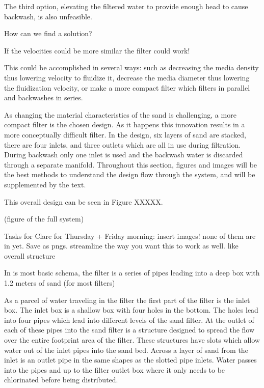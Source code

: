 \documentclass[letterpaper,10pt,english]{sphinxmanual}
\begin{document}
The third option, elevating the filtered water to provide enough head to cause backwash, is also unfeasible.


How can we find a solution?

If the velocities could be more similar the filter could work!

This could be accomplished in several ways: such as decreasing the media density thus lowering velocity to fluidize it, decrease the media diameter thus lowering the fluidization velocity, or make a more compact filter which filters in parallel and backwashes in series.

As changing the material characteristics of the sand is challenging, a more compact filter is the chosen design. As it happens this innovation results in a more conceptually difficult filter. In the design, six layers of sand are stacked, there are four inlets, and three outlets which are all in use during filtration. During backwash only one inlet is used and the backwash water is discarded through a separate manifold. Throughout this section, figures and images will be the best methods to understand the design flow through the system, and will be supplemented by the text.

This overall design can be seen in Figure XXXXX.

(figure of the full system)

Tasks for Clare for Thursday + Friday morning: insert images! none of them are in yet. Save as pngs. streamline the way you want this to work as well. like overall structure

In is most basic schema, the filter is a series of pipes leading into a deep box with 1.2 meters of sand (for most filters)

As a parcel of water traveling in the filter the first part of the filter is the inlet box. The inlet box is a shallow box with four holes in the bottom. The holes lead into four pipes which lead into different levels of the sand filter. At the outlet of each of these pipes into the sand filter is a structure designed to spread the flow over the entire footprint area of the filter. These structures have slots which allow water out of the inlet pipes into the sand bed. Across a layer of sand from the inlet is an outlet pipe in the same shapes as the slotted pipe inlets. Water passes into the pipes and up to the filter outlet box where it only needs to be chlorinated before being distributed.
\end{document}
